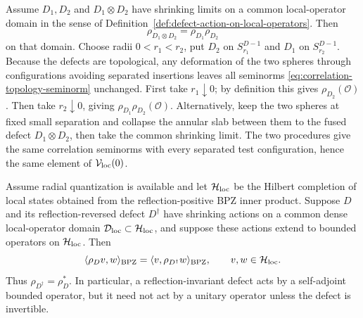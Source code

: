 \begin{remark}
\label{rem:defect-fusion-acts-by-composition}
Assume \(D_1,D_2\) and \(D_1\otimes D_2\) have shrinking limits on a common
local-operator domain in the sense of
Definition~\ref{def:defect-action-on-local-operators}.  Then
\begin{equation}
  \rho_{D_1\otimes D_2}=\rho_{D_1}\rho_{D_2}
  \label{eq:defect-fusion-action-composition}
\end{equation}
on that domain.
Choose radii \(0<r_1<r_2\), put \(D_2\) on \(S_{r_1}^{D-1}\) and \(D_1\) on
\(S_{r_2}^{D-1}\).  Because the defects are topological, any deformation of
the two spheres through configurations avoiding separated insertions leaves
all seminorms \eqref{eq:correlation-topology-seminorm} unchanged.  First take
\(r_1\downarrow0\); by definition this gives
\(\rho_{D_2}(\mathcal O)\).  Then take \(r_2\downarrow0\), giving
\(\rho_{D_1}\rho_{D_2}(\mathcal O)\).  Alternatively, keep the two spheres at
fixed small separation and collapse the annular slab between them to the
fused defect \(D_1\otimes D_2\), then take the common shrinking limit.  The
two procedures give the same correlation seminorms with every separated test
configuration, hence the same element of \(\mathcal V_{\rm loc}(0)\).
\end{remark}

\begin{proposition}
\label{prop:defect-action-reflection-adjoint}
Assume radial quantization is available and let
\(\mathcal H_{\rm loc}\) be the Hilbert completion of local states obtained
from the reflection-positive BPZ inner product.  Suppose \(D\) and its
reflection-reversed defect \(D^\dagger\) have shrinking actions on a common
dense local-operator domain \(\mathcal D_{\rm loc}\subset\mathcal H_{\rm loc}\),
and suppose these actions extend to bounded operators on
\(\mathcal H_{\rm loc}\).  Then
\begin{equation}
  \langle \rho_D v,w\rangle_{\rm BPZ}
  =
  \langle v,\rho_{D^\dagger}w\rangle_{\rm BPZ},
  \qquad v,w\in\mathcal H_{\rm loc}.
  \label{eq:defect-action-bpz-adjoint}
\end{equation}
Thus \(\rho_{D^\dagger}=\rho_D^*\).  In particular, a reflection-invariant
defect acts by a self-adjoint bounded operator, but it need not act by a
unitary operator unless the defect is invertible.
\end{proposition}

